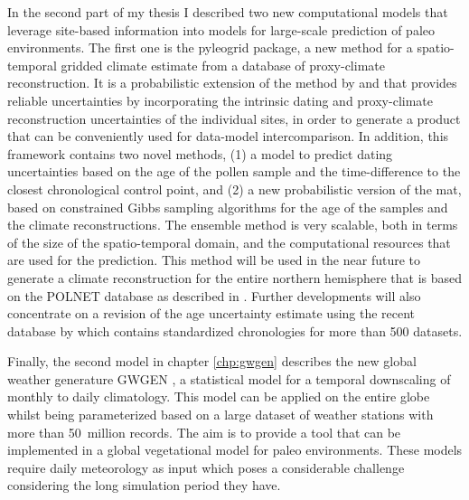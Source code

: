 \begin{refsection}
In the second part of my thesis I described two new computational models that leverage site-based information into models for large-scale prediction of paleo environments. The first one is the pyleogrid package, a new method for a spatio-temporal gridded climate estimate from a database of proxy-climate reconstruction. It is a probabilistic extension of the method by \cite{MauriDavisCollinsEtAl2015} and \cite{DavisBrewerStevensonEtAl2003} that provides reliable uncertainties by incorporating the intrinsic dating and proxy-climate reconstruction uncertainties of the individual sites, in order to generate a product that can be conveniently used for data-model intercomparison. In addition, this framework contains two novel methods, (1) a model to predict dating uncertainties based on the age of the pollen sample and the time-difference to the closest chronological control point, and (2) a new probabilistic version of the \gls{mat}, based on constrained Gibbs sampling algorithms for the age of the samples and the climate reconstructions. The ensemble method is very scalable, both in terms of the size of the spatio-temporal domain, and the computational resources that are used for the prediction. This method will be used in the near future to generate a climate reconstruction for the entire northern hemisphere that is based on the POLNET database as described in \cite{DavisKaplan2017}. Further developments will also concentrate on a revision of the age uncertainty estimate using the recent database by \cite{WangGoringMcGuire2019} which contains standardized chronologies for more than 500 datasets.

Finally, the second model in chapter \ref{chp:gwgen} describes the new global weather generature GWGEN \citep{SommerKaplan2017b}, a statistical model for a temporal downscaling of monthly to daily climatology. This model can be applied on the entire globe whilst being parameterized based on a large dataset of weather stations with more than 50~million records. The aim is to provide a tool that can be implemented in a global vegetational model for paleo environments. These models require daily meteorology as input which poses a considerable challenge considering the long simulation period they have.


\end{refsection}
